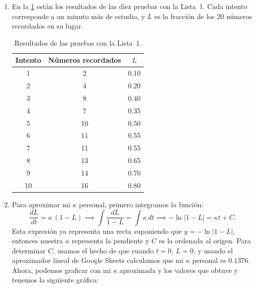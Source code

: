 \begin{solucion}
\begin{enumerate}
  \item En la \cref{tab:intentos-lista1} están los resultados de las diez
    pruebas con la Lista~1. Cada intento corresponde a un minuto más de
    estudio, y $L$ es la fracción de los 20 números recordados en su lugar.

    \begin{table}[H]
      \centering
      \caption{Resultados de las pruebas con la Lista~1.}
      \label{tab:intentos-lista1}
      \begin{tabular}{ccc}
        \toprule
        Intento & Números recordados & $L$ \\
        \midrule
         1 &  2 & 0.10 \\
         2 &  4 & 0.20 \\
         3 &  8 & 0.40 \\
         4 &  7 & 0.35 \\
         5 & 10 & 0.50 \\
         6 & 11 & 0.55 \\
         7 & 11 & 0.55 \\
         8 & 13 & 0.65 \\
         9 & 14 & 0.70 \\
        10 & 16 & 0.80 \\
        \bottomrule
      \end{tabular}
    \end{table}
  \item Para aproximar mi $\kappa$ personal, primero integramos la función:
    \[
      \frac{dL}{dt} = \kappa\,(1-L) \implies \int \frac{dL}{1-L} = \int \kappa\, dt
      \implies -\ln|1-L| = \kappa t + C.
    \]
    Esta expresión ya representa una recta suponiendo que $y = -\ln|1-L|$, entonces
    nuestra $\kappa$ representa la pendiente y $C$ es la ordenada al origen. Para determinar $C$, 
    usamos el hecho de que cuando $t=0$, $L=0$, y usando el aproximador lineal de Google Sheets calculamos
    que mi $\kappa$ personal es $0.1376$. Ahora, podemos graficar con mi $\kappa$ aproximada
    y los valores que obtuve y tenemos la siguiente gráfica:


\end{enumerate}
\end{solucion}
